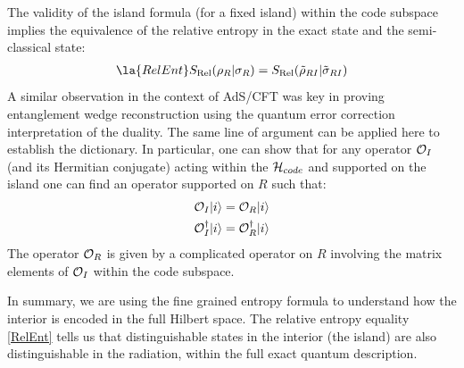 The validity of the island formula (for a fixed island) within the code subspace implies the equivalence of the relative entropy in the exact state and the semi-classical state:
\begin{align} \la{RelEnt}
S_\mathrm{Rel}(\rho_{R} | \sigma_{R}) = S_\mathrm{Rel}(\tilde{\rho}_{ R I} | \tilde{\sigma}_{ R I})
\end{align}
A similar observation in the context of AdS/CFT \cite{Jafferis:2015del} was key in proving entanglement wedge reconstruction \cite{Dong:2016eik} using the quantum error correction interpretation of the duality\cite{Almheiri:2014lwa}. The same line of argument can be applied here to establish the dictionary. In particular, one can show that for any operator ${\cal O}_I$ (and its Hermitian conjugate) acting within the ${\cal H}_{code}$ and supported on the island one can find an operator supported on $R$ such that:
\begin{align}
{\cal O}_I | i \rangle  &= {\cal O}_{R} | i \rangle \\
{\cal O}_I^\dagger | i \rangle  &= {\cal O}_{R}^\dagger | i \rangle
\end{align}
The operator $ {\cal O}_{R}$ is given by a complicated operator on ${R}$ involving the matrix elements of ${\cal O}_I$ within the code subspace. 



In summary, we are using the fine grained entropy formula to understand how the interior is encoded in the full Hilbert space. The relative entropy equality \eqref{RelEnt} tells us that distinguishable states in the interior (the island) are also distinguishable in the radiation, within the full exact quantum description. 













 
 
 
